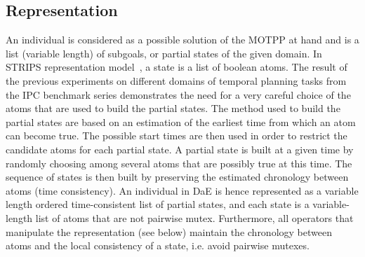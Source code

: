 \documentclass{llncs}
\begin{document}
\subsection{Representation}
\indent An individual is considered as a  possible solution of the MOTPP at hand and is a  list (variable length) of subgoals, or partial states of the given domain.
In STRIPS representation model~\cite{Fikes1971}, a state is a list of boolean atoms.  
The result of the previous experiments on different domains of temporal planning tasks from the
IPC benchmark series demonstrates the need for a very careful choice of the atoms that are used to build the partial states. 
The method used to build the partial states are based on an estimation of the earliest time from which an atom can become true. %
The possible start times are then used in order to restrict the candidate atoms for each partial state. A partial state is built at a given time by randomly choosing among several atoms that are possibly true at this time. The sequence of
states is then built by preserving the estimated chronology between atoms (time consistency). %
An individual in DaE is hence represented as a variable length ordered time-consistent list of partial states, and each state is a variable-length list of atoms that are not pairwise mutex. Furthermore, all operators that manipulate the representation (see below) maintain the chronology between atoms and the local consistency of a state, i.e. avoid 
pairwise mutexes.
\end{document}
